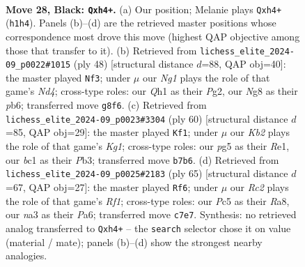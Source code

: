 \documentclass[11pt]{article}
\begin{document}
\clearpage

\begin{figure}[p]\centering
\begin{subfigure}{0.46\textwidth}\centering
\resizebox{\linewidth}{!}{%
\newchessgame
\chessboard[
  setfen={4Q1nr/1kr3p1/8/2p3Pp/5P1P/N1P5/PP3K2/R1B4q b - - 6 28},
  showmover=false,
  pgfstyle=straightmove, color=movearrow, markmove={h1-h4}
]}
\caption{}
\end{subfigure}\hfill
\begin{subfigure}{0.46\textwidth}\centering
\resizebox{\linewidth}{!}{%
\newchessgame
\chessboard[
  setfen={r5k1/p4pp1/Qp3b1p/8/3Nq3/8/PP4PP/3R2K1 w - - 0 25},
  showmover=false,
  pgfstyle=straightmove, color=movearrow, markmove={d4-f3}
]}
\caption{}
\end{subfigure}
\\[4pt]
\begin{subfigure}{0.46\textwidth}\centering
\resizebox{\linewidth}{!}{%
\newchessgame
\chessboard[
  setfen={3r1bk1/6p1/r5pp/p1n1B3/1p1N4/1P5P/1P3PP1/3RR1K1 w - - 1 31},
  showmover=false,
  pgfstyle=straightmove, color=movearrow, markmove={g1-f1}
]}
\caption{}
\end{subfigure}\hfill
\begin{subfigure}{0.46\textwidth}\centering
\resizebox{\linewidth}{!}{%
\newchessgame
\chessboard[
  setfen={r4r1k/1p4p1/p2P2Q1/P3p1p1/4P1Bq/7P/1P4P1/3R3K b - - 0 33},
  showmover=false,
  pgfstyle=straightmove, color=movearrow, markmove={f8-f6}
]}
\caption{}
\end{subfigure}
\caption{\textbf{Move 28, Black: \texttt{Qxh4+}.} (a) Our position; Melanie plays \texttt{Qxh4+} (\texttt{h1h4}). Panels (b)--(d) are the retrieved master positions whose correspondence most drove this move (highest QAP objective among those that transfer to it). (b) Retrieved from \texttt{lichess\_elite\_2024-09\_p0022\#1015} (ply 48) [structural distance $d$=88, QAP obj=40]: the master played \texttt{Nf3}; under $\mu$ our \emph{Ng1} plays the role of that game's \emph{Nd4}; cross-type roles: our \emph{Q}h1 as their \emph{P}g2, our \emph{N}g8 as their \emph{p}b6; transferred move \texttt{g8f6}. (c) Retrieved from \texttt{lichess\_elite\_2024-09\_p0023\#3304} (ply 60) [structural distance $d$=85, QAP obj=29]: the master played \texttt{Kf1}; under $\mu$ our \emph{Kb2} plays the role of that game's \emph{Kg1}; cross-type roles: our \emph{p}g5 as their \emph{R}e1, our \emph{b}c1 as their \emph{P}b3; transferred move \texttt{b7b6}. (d) Retrieved from \texttt{lichess\_elite\_2024-09\_p0025\#2183} (ply 65) [structural distance $d$=67, QAP obj=27]: the master played \texttt{Rf6}; under $\mu$ our \emph{Rc2} plays the role of that game's \emph{Rf1}; cross-type roles: our \emph{P}c5 as their \emph{R}a8, our \emph{n}a3 as their \emph{P}a6; transferred move \texttt{c7e7}. Synthesis: no retrieved analog transferred to \texttt{Qxh4+} -- the \texttt{search} selector chose it on value (material / mate); panels (b)--(d) show the strongest nearby analogies.}
\label{fig:thought-m55}
\end{figure}
\end{document}
